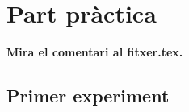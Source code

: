 \chapter{Part pràctica}
\label{c:Partpra}

\textbf{Mira el comentari al fitxer.tex.}

\section{Primer experiment}


